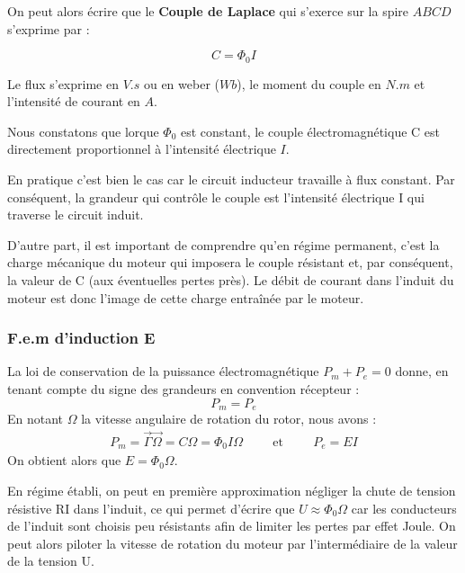 \documentclass[12pt,prb,aps,epsf]{article}
\begin{document}
On peut alors écrire que le \textbf{Couple de Laplace} qui s'exerce sur la spire $ABCD$ s'exprime par :

\begin{equation}
    C = \Phi_0 I
\end{equation}

Le flux s'exprime en $V.s$ ou en weber ($Wb$), le moment du couple en $N.m$ et l'intensité de courant en $A$.\medskip

Nous constatons que lorque $\Phi_0$ est constant, le couple électromagnétique C est directement proportionnel à l'intensité électrique $I$. \medskip

En pratique c'est bien le cas car le circuit inducteur travaille à flux constant. Par conséquent, la grandeur qui contrôle le couple est l'intensité électrique I qui traverse le circuit induit.\medskip

D'autre part, il est important de comprendre qu'en régime permanent, c'est la charge mécanique du moteur qui imposera le couple résistant et, par conséquent, la valeur de C (aux éventuelles pertes près). Le débit de courant dans l'induit du moteur est donc l'image de cette charge entraînée par le moteur.


\subsubsection{F.e.m d'induction E}

La loi de conservation de la puissance électromagnétique $P_m + P_e =0$ donne, en tenant compte du signe des grandeurs en convention récepteur :
\begin{equation}
    P_m = P_e
\end{equation}
En notant $\Omega$ la vitesse angulaire de rotation du rotor, nous avons :
\begin{eqnarray}
    P_m = \vec{\Gamma}\vec{\Omega}= C \Omega = \Phi_0 I \Omega\hspace{1cm}\mathrm{et}\hspace{1cm}
    P_e = EI
\end{eqnarray}
On obtient alors que $E= \Phi_0 \Omega$. \medskip

En régime établi, on peut en première approximation négliger la chute de tension résistive RI dans l'induit, ce qui permet d'écrire que $U \approx \Phi_0 \Omega$ car les conducteurs de l'induit sont choisis peu résistants afin de limiter les pertes par effet Joule. On peut alors piloter la vitesse de rotation du moteur par l'intermédiaire de la valeur de la tension U.
\end{document}
